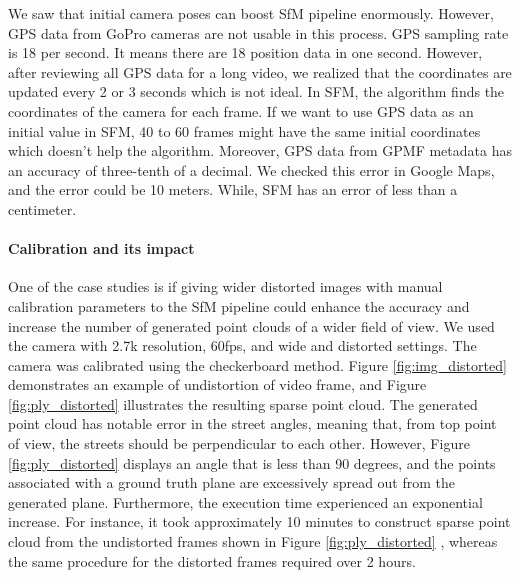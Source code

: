 \documentclass[11pt]{article}
\begin{document}
    We saw that initial camera poses can boost SfM pipeline enormously. However, GPS data from GoPro cameras
    are not usable in this process.
    GPS sampling rate is 18 per second. It means there are 18 position data in one second. However, after reviewing
    all GPS data for a long video, we realized that the coordinates are updated every 2 or 3 seconds which is not ideal.
    In SFM, the algorithm finds the coordinates of the camera for each frame. If we want to use GPS data as an initial
    value in SFM, 40 to 60 frames might have the same initial coordinates which doesn't help the algorithm.
    Moreover, GPS data from GPMF metadata has an accuracy of three-tenth of a decimal. We checked this error in
    Google Maps, and the error could be 10 meters. While, SFM has an error of less than a centimeter.

    \paragraph{Calibration and its impact}
    One of the case studies is if giving wider distorted images with manual calibration parameters to the SfM pipeline
    could enhance the accuracy and increase the number of generated point clouds of a wider field of view. We used
    the camera with 2.7k resolution, 60fps, and wide and distorted settings. The camera was calibrated using the
    checkerboard method. Figure \ref{fig:img_distorted} demonstrates an example of undistortion of video frame,
    and Figure \ref{fig:ply_distorted} illustrates the resulting sparse point cloud.
    The generated point cloud has notable error in the street angles, meaning that, from top point of view, the
    streets should be perpendicular to each other. However, Figure \ref{fig:ply_distorted} displays an angle that is less than 90 degrees,
    and the points associated with a ground truth plane are excessively spread out from the generated plane.
    Furthermore, the execution time experienced an exponential increase. For instance, it took approximately
    10 minutes to construct sparse point cloud from the undistorted frames shown in Figure \ref{fig:ply_distorted}
    , whereas the same procedure for the distorted frames required over 2 hours.
\end{document}
